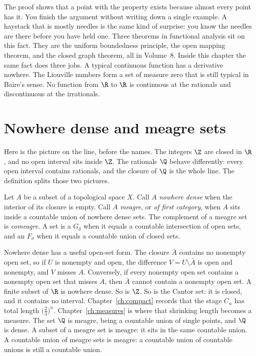 The proof shows that a point with the property exists because almost every point has it. You finish the argument without writing down a single example. A haystack that is mostly needles is the same kind of surprise: you know the needles are there before you have held one. Three theorems in functional analysis sit on this fact. They are the uniform boundedness principle, the open mapping theorem, and the closed graph theorem, all in Volume~8.
Inside this chapter the same fact does three jobs. A typical continuous function has a derivative nowhere. The Liouville numbers form a set of measure zero that is still typical in Baire's sense. No function from $\R$ to $\R$ is continuous at the rationals and discontinuous at the irrationals.

\section{Nowhere dense and meagre sets}

Here is the picture on the line, before the names. The integers $\Z$ are closed in $\R$, and no open interval sits inside $\Z$. The rationals $\Q$ behave differently: every open interval contains rationals, and the closure of $\Q$ is the whole line. The definition splits those two pictures.

\begin{definition}
Let $A$ be a subset of a topological space $X$. Call $A$ \emph{nowhere dense} when the interior of its closure is empty. Call $A$ \emph{meagre}, or \emph{of first category}, when $A$ sits inside a countable union of nowhere dense sets. The complement of a meagre set is \emph{comeagre}. A set is a $G_\delta$ when it equals a countable intersection of open sets, and an $F_\sigma$ when it equals a countable union of closed sets.
\end{definition}

Nowhere dense has a useful open-set form. The closure $\bar A$ contains no nonempty open set, so if $U$ is nonempty and open, the difference $V=U\setminus\bar A$ is open and nonempty, and $V$ misses $A$. Conversely, if every nonempty open set contains a nonempty open set that misses $A$, then $\bar A$ cannot contain a nonempty open set. A finite subset of $\R$ is nowhere dense. So is $\Z$. So is the Cantor set: it is closed, and it contains no interval. Chapter~\ref{ch:compact} records that the stage $C_n$ has total length $\bigl(\frac23\bigr)^n$. Chapter~\ref{ch:measures} is where that shrinking length becomes a measure. The set $\Q$ is meagre, being a countable union of single points, and $\Q$ is dense. A subset of a meagre set is meagre: it sits in the same countable union. A countable union of meagre sets is meagre: a countable union of countable unions is still a countable union.

